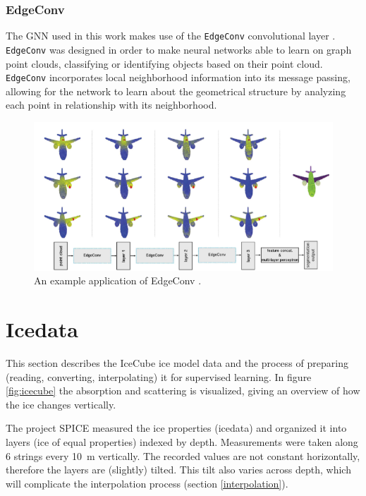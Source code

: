 \documentclass[a4paper,10pt]{scrartcl}
\begin{document}
\subsubsection*{EdgeConv}

The GNN used in this work makes use of the \texttt{EdgeConv} convolutional layer \cite{1801.07829}.
\texttt{EdgeConv} was designed in order to make neural networks able to learn on graph point clouds, classifying or identifying objects based on their point cloud.
\texttt{EdgeConv} incorporates local neighborhood information into its message passing, allowing for the network to learn about the geometrical structure by analyzing each point in relationship with its neighborhood.

\begin{figure}[h]
    \includegraphics[width=\textwidth]{images/edgeconv.png}
    \centering
    \caption{An example application of EdgeConv \cite{1801.07829}.}
    \label{fig:edgeconv}
\end{figure}


\section{Icedata}
\label{icedata}

This section describes the IceCube ice model data and the process of preparing (reading, converting, interpolating) it for supervised learning.
In figure \ref{fig:icecube} the absorption and scattering is visualized, giving an overview of how the ice changes vertically.

The project SPICE \cite{1301.5361} measured the ice properties (icedata) and organized it into layers (ice of equal properties) indexed by depth.
Measurements were taken along 6 strings every \SI{10}{m} vertically.
The recorded values are not constant horizontally, therefore the layers are (slightly) tilted.
This tilt also varies across depth, which will complicate the interpolation process (section \ref{interpolation}).
\end{document}
